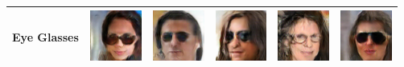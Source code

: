 \begin{table}[ht]
\begin{tabular}{|llllll|}
Eye Glasses  & \includegraphics[width=1.69cm, height=1.69cm]{Files/images/images7/image79.png}  &\includegraphics[width=1.69cm, height=1.69cm]{Files/images/images7/image4.png}   & \includegraphics[width=1.69cm, height=1.69cm]{Files/images/images7/image27.png}  & \includegraphics[width=1.69cm, height=1.69cm]{Files/images/images7/image25.png}  & \includegraphics[width=1.69cm, height=1.69cm]{Files/images/images7/image67.png} \\ \hline
\end{tabular}
\end{table}

